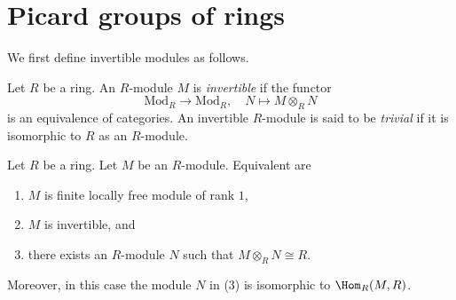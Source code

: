 \section{Picard groups of rings}
\label{section-picard}

\noindent
We first define invertible modules as follows.

\begin{definition}
\label{definition-invertible}
Let $R$ be a ring. An $R$-module $M$ is {\it invertible} if the functor
$$
\text{Mod}_R \longrightarrow \text{Mod}_R,\quad
N \longmapsto M \otimes_R N
$$
is an equivalence of categories. An invertible $R$-module is said to be
{\it trivial} if it is isomorphic to $R$ as an $R$-module.
\end{definition}

\begin{lemma}
\label{lemma-invertible}
Let $R$ be a ring. Let $M$ be an $R$-module. Equivalent are
\begin{enumerate}
\item $M$ is finite locally free module of rank $1$,
\item $M$ is invertible, and
\item there exists an $R$-module $N$ such that $M \otimes_R N \cong R$.
\end{enumerate}
Moreover, in this case the module $N$ in (3) is isomorphic
to $\Hom_R(M, R)$.
\end{lemma}

